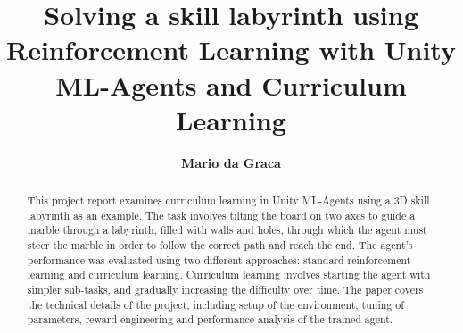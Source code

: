 \documentclass[runningheads]{llncs}
\begin{document}
%
    \title{Solving a skill labyrinth using Reinforcement Learning with Unity ML-Agents and Curriculum Learning}
%
%
    \author{\textbf{Mario da Graca}}
%
%
    \maketitle              %
%
    \begin{abstract}
        This project report examines curriculum learning in Unity ML-Agents using a 3D skill labyrinth as an example.
        The task involves tilting the board on two axes to guide a marble through a labyrinth, filled with walls and holes, through which the agent must steer the marble in order to follow the correct path and reach the end.
        The agent's performance was evaluated using two different approaches: standard reinforcement learning and curriculum learning.
        Curriculum learning involves starting the agent with simpler sub-tasks, and gradually increasing the difficulty over time.
        The paper covers the technical details of the project, including setup of the environment, tuning of parameters, reward engineering and performance analysis of the trained agent.

    \end{abstract}
    
    
    
    \clearpage
    
    
%
\end{document}
